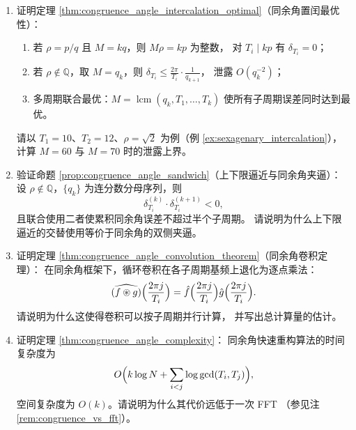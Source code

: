 \begin{enumerate}[leftmargin=3em, label=\textbf{题 \arabic*}]
    \item 证明定理 \ref{thm:congruence_angle_intercalation_optimal}（同余角置闰最优性）：
    \begin{enumerate}[label=(\roman*)]
        \item 若 $\rho=p/q$ 且 $M=kq$，则 $M\rho=kp$ 为整数，
              对 $T_i\mid kp$ 有 $\delta_{T_i}=0$；
        \item 若 $\rho\notin\mathbb{Q}$，取 $M=q_k$，则
              $\delta_{T_i}\le\frac{2\pi}{T_i}\cdot\frac{1}{q_{k+1}}$，
              泄露 $O(q_k^{-2})$；
        \item 多周期联合最优：$M=\operatorname{lcm}(q_k,T_1,\dots,T_k)$
              使所有子周期误差同时达到最优。
    \end{enumerate}
    请以 $T_1=10$、$T_2=12$、$\rho=\sqrt{2}$ 为例（例 \ref{ex:sexagenary_intercalation}），
    计算 $M=60$ 与 $M=70$ 时的泄露上界。

    \item 验证命题 \ref{prop:congruence_angle_sandwich}（上下限逼近与同余角夹逼）：
    设 $\rho\notin\mathbb{Q}$，$\{q_k\}$ 为连分数分母序列，则
    \[
    \delta_{T_i}^{(k)}\cdot\delta_{T_i}^{(k+1)}<0,
    \]
    且联合使用二者使累积同余角误差不超过半个子周期。
    请说明为什么上下限逼近的交替使用等价于同余角的双侧夹逼。

    \item 证明定理 \ref{thm:congruence_angle_convolution_theorem}（同余角卷积定理）：
    在同余角框架下，循环卷积在各子周期基频上退化为逐点乘法：
    \[
    \widehat{(f\circledast g)}\Bigl(\frac{2\pi j}{T_i}\Bigr)
    =\hat{f}\Bigl(\frac{2\pi j}{T_i}\Bigr)\hat{g}\Bigl(\frac{2\pi j}{T_i}\Bigr).
    \]
    请说明为什么这使得卷积可以按子周期并行计算，
    并写出总计算量的估计。

    \item 证明定理 \ref{thm:congruence_angle_complexity}：
    同余角快速重构算法的时间复杂度为
    \[
    O\Bigl(k\log N+\sum_{i<j}\log\gcd(T_i,T_j)\Bigr),
    \]
    空间复杂度为 $O(k)$。请说明为什么其代价远低于一次 FFT
    （参见注 \ref{rem:congruence_vs_fft}）。


\end{enumerate}
